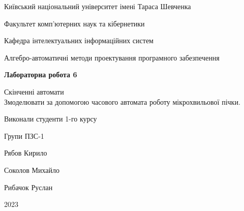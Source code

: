 \documentclass[12pt,a4paper]{article}
\begin{document}
\begin{titlepage}
    \centering
    \vspace*{1cm}

    \Large
    Київський національний університет імені Тараса Шевченка \\

    \vspace{0.5cm}

    \large
    Факультет комп'ютерних наук та кібернетики \\

    \vspace{0.5cm}

    Кафедра інтелектуальних інформаційних систем \\

    \vspace{0.5cm}

    Алгебро-автоматичні методи проектування програмного забезпечення \\

    \vspace{3cm}

    \textbf{Лабораторна робота 6} \\

    \vspace{0.5cm}

    Скінченні автомати \\
    Змоделювати за допомогою часового автомата роботу мікрохвильової пічки.

    \vspace{2cm}

    Виконали студенти 1-го курсу \\

    \vspace{0.2cm}

    Групи ПЗС-1 \\

    \vspace{0.1cm}

    Рябов Кирило \\

    \vspace{0.1cm}

    Соколов Михайло \\

    \vspace{0.1cm}

    Рибачок Руслан \\

    \vfill

    2023

\end{titlepage}
\end{document}
